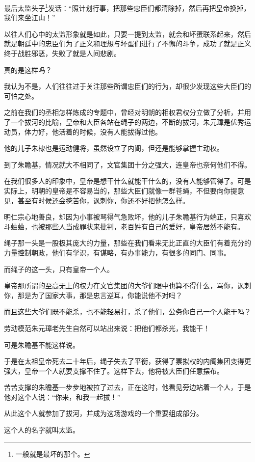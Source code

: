 \begin{multicols}{\theparacolNo}
最后太监头子\footnote{一般就是最坏的那个。}发话：“照计划行事，把那些忠臣们都清除掉，然后再把皇帝换掉，我们来坐江山！”

以往人们心中的太监形象就是如此，只要一提到太监，就会和坏蛋联系起来，然后就是朝廷中的忠臣们为了正义和理想与坏蛋们进行了不懈的斗争，成功了就是正义终于战胜邪恶，失败了就是人间悲剧。

真的是这样吗？

我认为不是，人们往往过于关注那些所谓忠臣们的行为，却很少发现这些大臣们的可怕之处。

之前在我们的丞相怎样炼成的专题中，曾经对明朝的相权君权分立做了分析，并用了一个拔河的比喻，皇帝和大臣各站在绳子的两边，不断的拔河，朱元璋是优秀运动员，体力好，他活着的时候，没有人能拔得过他。

他的儿子朱棣也是运动健将，虽然设立了内阁，但还是能够掌握主动权。

到了朱瞻基，情况就大不相同了，文官集团十分之强大，连皇帝也奈何他们不得。

在我们很多人的印象中，皇帝是想干什么就能干什么的，没有人能够管得了。可是实际上，明朝的皇帝是不容易当的，那些大臣们就像一群苍蝇，不但要向你提意见，甚至有时候还会挖苦你，讽刺你，你还不好把他怎么样。

明仁宗心地善良，却因为小事被骂得气急败坏，他的儿子朱瞻基行为端正，只喜欢斗蛐蛐，也被那些人当成罪状来批判，老百姓有自己的爱好，皇帝居然不能有。

绳子那一头是一股极其庞大的力量，那些在我们看来无比正直的大臣们有着充分的力量控制朝政，他们有学识，有谋略，有办事能力，有很多的同门、同事。

而绳子的这一头，只有皇帝一个人。

皇帝那所谓的至高无上的权力在文官集团的大爷们眼中也算不得什么，骂你，讽刺你，那是为了国家大事，那是忠言逆耳，你能说他不对吗？

而且这些大爷们既不能杀，也不能轻易打，杀了他们，公务你自己一个人能干吗？

劳动模范朱元璋老先生自然可以站出来说：把他们都杀光，我能干！

可是朱瞻基不能这样说。

于是在太祖皇帝死去二十年后，绳子失去了平衡，获得了票拟权的内阁集团变得更强大，皇帝一个人就要支撑不住了。这样下去，他将被大臣们任意摆布。

苦苦支撑的朱瞻基一步步地被拉了过去，正在这时，他看见旁边站着一个人，于是他对这个人说：“你来，和我一起拔！”

从此这个人就参加了拔河，并成为这场游戏的一个重要组成部分。

这个人的名字就叫太监。


\end{multicols}
